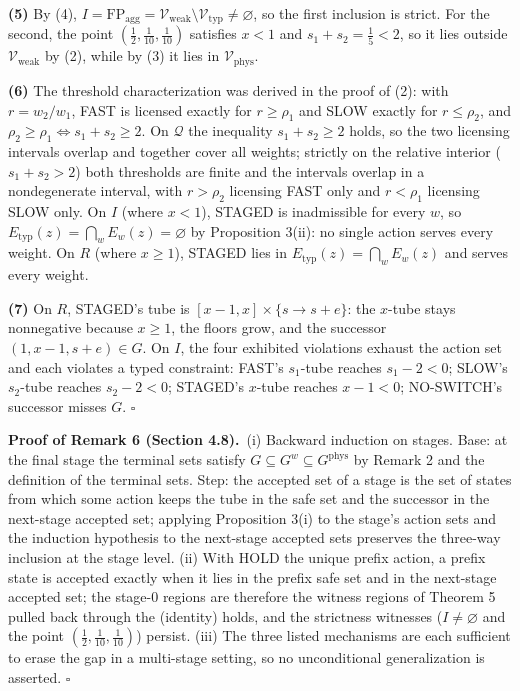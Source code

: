 \documentclass[review,11pt]{elsarticle}
\begin{document}
\textbf{(5)} By (4),
\(I = \mathrm{FP}_{\mathrm{agg}} = \mathcal{V}_{\mathrm{weak}} \setminus \mathcal{V}_{\mathrm{typ}} \neq \varnothing\),
so the first inclusion is strict. For the second, the point
\((\tfrac12, \tfrac1{10}, \tfrac1{10})\) satisfies \(x < 1\) and
\(s_1 + s_2 = \tfrac15 < 2\), so it lies outside
\(\mathcal{V}_{\mathrm{weak}}\) by (2), while by (3) it lies in
\(\mathcal{V}_{\mathrm{phys}}\).

\textbf{(6)} The threshold characterization was derived in the proof of
(2): with \(r = w_2 / w_1\), FAST is licensed exactly for
\(r \ge \rho_1\) and SLOW exactly for \(r \le \rho_2\), and
\(\rho_2 \ge \rho_1 \iff s_1 + s_2 \ge 2\). On \(\mathcal{Q}\) the
inequality \(s_1 + s_2 \ge 2\) holds, so the two licensing intervals
overlap and together cover all weights; strictly on the relative
interior (\(s_1 + s_2 > 2\)) both thresholds are finite and the
intervals overlap in a nondegenerate interval, with \(r > \rho_2\)
licensing FAST only and \(r < \rho_1\) licensing SLOW only. On \(I\)
(where \(x < 1\)), STAGED is inadmissible for every \(w\), so
\(E_{\mathrm{typ}}(z) = \bigcap_w E_w(z) = \varnothing\) by Proposition
3(ii): no single action serves every weight. On \(R\) (where
\(x \ge 1\)), STAGED lies in \(E_{\mathrm{typ}}(z) = \bigcap_w E_w(z)\)
and serves every weight.

\textbf{(7)} On \(R\), STAGED's tube is
\([x - 1, x] \times \{s \to s + e\}\): the \(x\)-tube stays nonnegative
because \(x \ge 1\), the floors grow, and the successor
\((1, x - 1, s + e) \in G\). On \(I\), the four exhibited violations
exhaust the action set and each violates a typed constraint: FAST's
\(s_1\)-tube reaches \(s_1 - 2 < 0\); SLOW's \(s_2\)-tube reaches
\(s_2 - 2 < 0\); STAGED's \(x\)-tube reaches \(x - 1 < 0\); NO-SWITCH's
successor misses \(G\). \ensuremath{\square}

\textbf{Proof of Remark 6 (Section 4.8).}\ (i) Backward induction on stages. Base: at the final stage
the terminal sets satisfy
\(G \subseteq G^w \subseteq G^{\mathrm{phys}}\) by Remark 2 and the
definition of the terminal sets. Step: the accepted set of a stage is
the set of states from which some action keeps the tube in the safe set
and the successor in the next-stage accepted set; applying Proposition
3(i) to the stage's action sets and the induction hypothesis to the
next-stage accepted sets preserves the three-way inclusion at the stage
level. (ii) With HOLD the unique prefix action, a prefix state is
accepted exactly when it lies in the prefix safe set and in the
next-stage accepted set; the stage-0 regions are therefore the witness
regions of Theorem 5 pulled back through the (identity) holds, and the
strictness witnesses (\(I \neq \varnothing\) and the point
\((\tfrac12, \tfrac1{10}, \tfrac1{10})\)) persist. (iii) The three
listed mechanisms are each sufficient to erase the gap in a multi-stage
setting, so no unconditional generalization is asserted. \ensuremath{\square}
\end{document}
